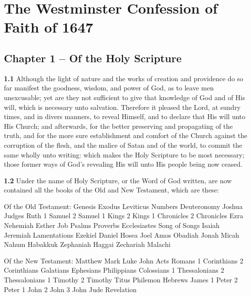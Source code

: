 \chapter{The Westminster Confession of Faith of 1647} 

\section{Chapter 1 -- Of the Holy Scripture} 

\par\textbf{1.1} Although the light of nature and the works of creation and providence do so far manifest the goodness, wisdom, and power of God, as to leave men unexcusable; yet are they not sufficient to give that knowledge of God and of His will, which is necessary unto salvation. Therefore it pleased the Lord, at sundry times, and in divers manners, to reveal Himself, and to declare that His will unto His Church; and afterwards, for the better preserving and propagating of the truth, and for the more sure establishment and comfort of the Church against the corruption of the flesh, and the malice of Satan and of the world, to commit the same wholly unto writing: which makes the Holy Scripture to be most necessary; those former ways of God's revealing His will unto His people being now ceased.   

\par\textbf{1.2} Under the name of Holy Scripture, or the Word of God written, are now contained all the books of the Old and New Testament, which are these:

\par Of the Old Testament: Genesis  Exodus  Leviticus  Numbers  Deuteronomy  Joshua  Judges  Ruth  1 Samuel  2 Samuel  1 Kings  2 Kings  1 Chronicles  2 Chronicles  Ezra  Nehemiah  Esther  Job  Psalms  Proverbs  Ecclesiastes  Song of Songs  Isaiah  Jeremiah  Lamentations  Ezekiel  Daniel  Hosea  Joel  Amos  Obadiah  Jonah  Micah  Nahum  Habakkuk  Zephaniah  Haggai  Zechariah  Malachi

\par Of the New Testament: Matthew  Mark  Luke  John  Acts  Romans  1 Corinthians  2 Corinthians  Galatians  Ephesians  Philippians  Colossians  1 Thessalonians  2 Thessalonians  1 Timothy  2 Timothy  Titus  Philemon  Hebrews  James  1 Peter  2 Peter  1 John  2 John  3 John  Jude  Revelation

